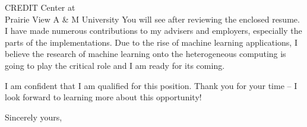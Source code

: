 \documentclass[12pt]{letter} %
\newcounter{comment}
\begin{document}
\begin{letter}{
CREDIT Center at\\
Prairie View A \& M University
}
You will see after reviewing the enclosed resume.  I have made numerous contributions to my advisers
and employers, especially the parts of the implementations.  Due to the rise of machine learning applications, 
I believe the research of machine learning onto the heterogeneous computing is going to play the critical role and
I am ready for its coming. 

I am confident that I am qualified for this position. Thank you for your time -- I look forward to learning more about this opportunity!

\closing{Sincerely yours,}




\end{letter}
\end{document}
